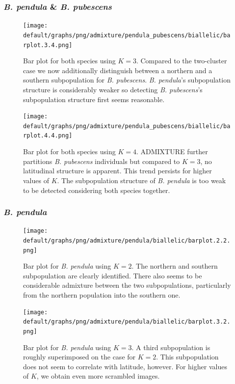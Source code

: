\documentclass[hidelinks,11pt]{article}
\newcommand{\pendula}{\textit{B. pendula}}
\newcommand{\pubescens}{\textit{B. pubescens}}
\begin{document}
    \subsubsection{\pendula{} \& \pubescens{}}

    \begin{figure}[H]
        \centering
        \texttt{[image: default/graphs/png/admixture/pendula\_pubescens/biallelic/barplot.3.4.png]}
        \caption{Bar plot for both species using $K=3$. Compared to the two-cluster case we now additionally distinguish between a northern and a southern subpopulation for \pubescens{}. \pendula{}'s subpopulation structure is considerably weaker so detecting \pubescens{}'s subpopulation structure first seems reasonable.}
        \label{fig:admixture_barplot_pendula_pubescens_3}
    \end{figure}

    \begin{figure}[H]
        \centering
        \texttt{[image: default/graphs/png/admixture/pendula\_pubescens/biallelic/barplot.4.4.png]}
        \caption{Bar plot for both species using $K=4$. \mbox{ADMIXTURE} further partitions \pubescens{} individuals but compared to $K=3$, no latitudinal structure is apparent. This trend persists for higher values of $K$. The subpopulation structure of \pendula{} is too weak to be detected considering both species together.}
        \label{fig:admixture_barplot_pendula_pubescens_4}
    \end{figure}

    \subsubsection{\pendula{}}

    \begin{figure}[H]
        \centering
        \texttt{[image: default/graphs/png/admixture/pendula/biallelic/barplot.2.2.png]}
        \caption{Bar plot for \pendula{} using $K=2$. The northern and southern subpopulation are clearly identified. There also seems to be considerable admixture between the two subpopulations, particularly from the northern population into the southern one.}
        \label{fig:admixture_barplot_pendula_2}
    \end{figure}

    \begin{figure}[H]
        \centering
        \texttt{[image: default/graphs/png/admixture/pendula/biallelic/barplot.3.2.png]}
        \caption{Bar plot for \pendula{} using $K=3$. A third subpopulation is roughly superimposed on the case for $K=2$. This subpopulation does not seem to correlate with latitude, however. For higher values of $K$, we obtain even more scrambled images.}
        \label{fig:admixture_barplot_pendula_3}
    \end{figure}
\end{document}
